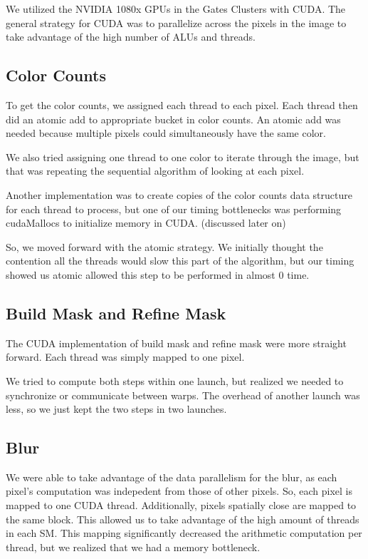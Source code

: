 \documentclass[12pt]{article}
\begin{document}
We utilized the NVIDIA 1080x GPUs in the Gates Clusters with CUDA. The general
strategy for CUDA was to parallelize across the pixels in the image to take
advantage of the high number of ALUs and threads.

\subsection{Color Counts}

To get the color counts, we assigned each thread to each pixel. Each thread
then did an atomic add to appropriate bucket in color counts. An atomic add was
needed because multiple pixels could simultaneously have the same color.

We also tried assigning one thread to one color to iterate through the image,
but that was repeating the sequential algorithm of looking at each pixel.

Another implementation was to create copies of the color counts data structure
for each thread to process, but one of our timing bottlenecks was performing
cudaMallocs to initialize memory in CUDA. (discussed later on)

So, we moved forward with the atomic strategy. We initially thought the
contention all the threads would slow this part of the algorithm, but our
timing showed us atomic allowed this step to be performed in almost 0 time.

\subsection{Build Mask and Refine Mask}

The CUDA implementation of build mask and refine mask were more straight
forward. Each thread was simply mapped to one pixel.

We tried to compute both steps within one launch, but realized we needed to
synchronize or communicate between warps. The overhead of another launch was
less, so we just kept the two steps in two launches.

\subsection{Blur}

We were able to take advantage of the data parallelism for the blur, as each
pixel's computation was indepedent from those of other pixels. So, each pixel
is mapped to one CUDA thread. Additionally, pixels spatially close are mapped
to the same block. This allowed us to take advantage of the high amount of
threads in each SM. This mapping significantly decreased the arithmetic
computation per thread, but we realized that we had a memory bottleneck.
\end{document}
